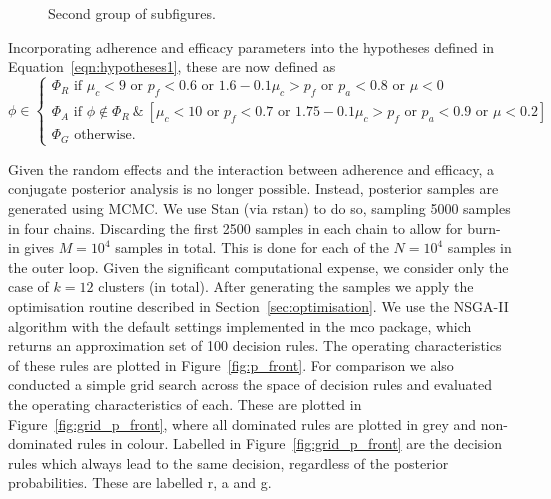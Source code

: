 \documentclass{article} %
\begin{document}
\begin{figure}
   \centering
   \quad
   \\
   \quad
   \\
   \caption{Second group of subfigures.}
   \label{fig:priors2}
\end{figure}

Incorporating adherence and efficacy parameters into the hypotheses defined in Equation~\ref{eqn:hypotheses1}, these are now defined as
\begin{equation}
  \phi \in \begin{cases}
               \Phi_{R} \text{ if } \mu_{c} < 9 \text{ or } p_{f} < 0.6 \text{ or } 1.6 - 0.1\mu_{c} > p_{f} \text{ or } p_{a} < 0.8 \text{ or } \mu < 0 \\
               \Phi_{A} \text{ if } \phi \not\in \Phi_{R} ~\&~ [ \mu_{c} < 10 \text{ or } p_{f} < 0.7 \text{ or } 1.75 - 0.1\mu_{c} > p_{f} \text{ or } p_{a} < 0.9 \text{ or } \mu < 0.2 ] \\
               \Phi_{G} \text{ otherwise.}
            \end{cases}
\end{equation}

Given the random effects and the interaction between adherence and efficacy, a conjugate posterior analysis is no longer possible. Instead, posterior samples are generated using MCMC. We use Stan (via rstan) to do so, sampling  5000 samples in four chains. Discarding the first 2500 samples in each chain to allow for burn-in gives $M = 10^4$ samples in total. This is done for each of the $N = 10^4$ samples in the outer loop. Given the significant computational expense, we consider only the case of $k=12$ clusters (in total). After generating the samples we apply the optimisation routine described in Section~\ref{sec:optimisation}. We use the NSGA-II algorithm with the default settings implemented in the mco package, which returns an approximation set of 100 decision rules. The operating characteristics of these rules are plotted in Figure~\ref{fig:p_front}. For comparison we also conducted a simple grid search across the space of decision rules and evaluated the operating characteristics of each. These are plotted in Figure~\ref{fig:grid_p_front}, where all dominated rules are plotted in grey and non-dominated rules in colour. Labelled in Figure~\ref{fig:grid_p_front} are the decision rules which always lead to the same decision, regardless of the posterior probabilities. These are labelled r, a and g.
\end{document}
